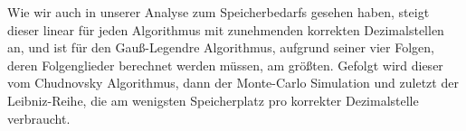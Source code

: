 \documentclass{scrartcl}
\theoremstyle{definition}
\newtheorem{approximation sequence}{Annäherungsfolge}
\begin{document}
Wie wir auch in unserer Analyse zum Speicherbedarfs gesehen haben, steigt dieser linear für jeden Algorithmus mit zunehmenden korrekten Dezimalstellen an, und ist für den Gauß-Legendre Algorithmus, aufgrund seiner vier Folgen,
deren Folgenglieder berechnet werden müssen, am größten. Gefolgt wird dieser vom Chudnovsky Algorithmus, dann der Monte-Carlo Simulation und zuletzt der Leibniz-Reihe, die am wenigsten Speicherplatz pro korrekter Dezimalstelle 
verbraucht.

\printbibliography
\end{document}
